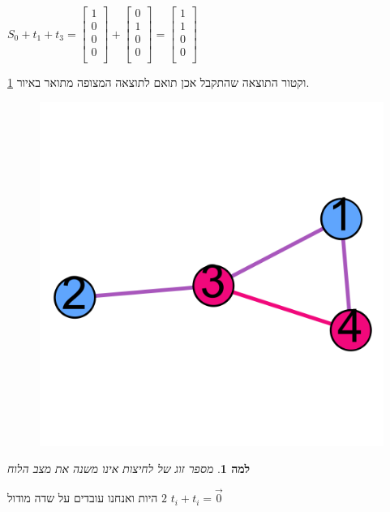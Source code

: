 \documentclass[12pt,twoside]{article}
\newtheorem{lemma}{למה}[section]
\begin{document}
$
    S_0 + t_1 + t_3 = 
    \begin{bmatrix}
        1 \\
        0 \\
        0 \\
        0 \\
    \end{bmatrix}
    +
    \begin{bmatrix}
        0 \\
        1 \\
        0 \\
        0 \\
    \end{bmatrix}
    =
    \begin{bmatrix}
        1 \\
        1 \\
        0 \\
        0 \\
    \end{bmatrix}
$

וקטור התוצאה שהתקבל אכן תואם לתוצאה המצופה
מתואר באיור 
\ref{fig:start graph presses solution}.

\begin{figure}[ht]
    \caption{}
    \label{fig:start graph presses solution}
    \unsethebrew
    \centering
    \includegraphics[width=.7\textwidth,height=.7\textheight,keepaspectratio]{images/graph_presses_solve.png}
\end{figure}
\sethebrew

\begin{lemma}
    \label{lemma: sum same change vect}
    מספר זוג של לחיצות אינו משנה את מצב הלוח
\end{lemma}
היות 
ואנחנו עובדים על שדה מודול 
$2$
$t_i + t_i = \vec{0}$
\end{document}
